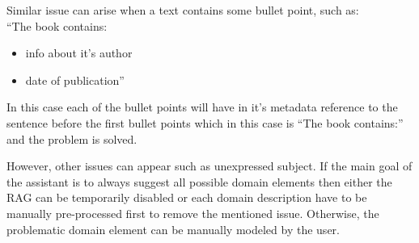 Similar issue can arise when a text contains some bullet point, such as: \\

``The book contains:
\begin{itemize}
\item info about it's author
\item date of publication''
\end{itemize}

In this case each of the bullet points will have in it's metadata reference to the sentence before the first bullet points which in this case is ``The book contains:'' and the problem is solved.

However, other issues can appear such as unexpressed subject. If the main goal of the assistant is to always suggest all possible domain elements then either the RAG can be temporarily disabled or each domain description have to be manually pre-processed first to remove the mentioned issue. Otherwise, the problematic domain element can be manually modeled by the user.